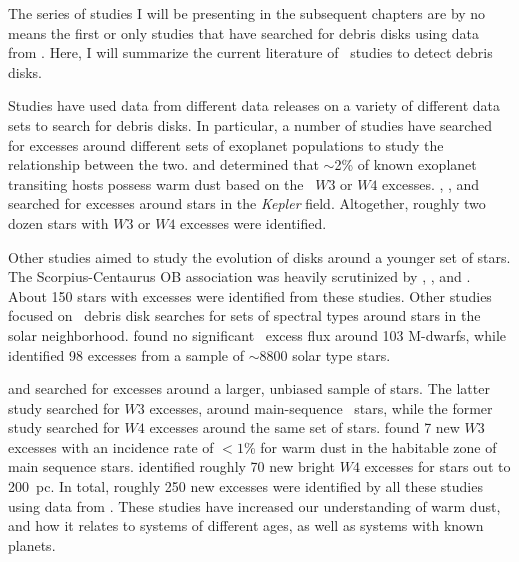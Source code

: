     The series of studies I will be presenting in the subsequent chapters are by no means the first or only studies that have searched for debris disks using data from \WS. Here, I will summarize the current literature of \WS\ studies to detect debris disks.
    
    Studies have used data from different data releases on a variety of different data sets to search for debris disks. In particular, a number of studies have searched for excesses around different sets of exoplanet populations to study the relationship between the two. \citet{Krivov2011} and \citet{Morales2012} determined that $\sim$2\% of known exoplanet transiting hosts possess warm dust based on the \WS\ $W3$ or $W4$ excesses. \citet{Kennedy2012}, \citet{Ribas2012}, and \citet{Lawler2012} searched for excesses around stars in the \textit{Kepler} field. Altogether, roughly two dozen stars with $W3$ or $W4$ excesses were identified. 
    
    Other studies aimed to study the evolution of disks around a younger set of stars. The Scorpius-Centaurus OB association was heavily scrutinized by \citet{Rizzuto2012}, \citet{Luhman2012}, and \citet{Riaz2012}. About 150 stars with excesses were identified from these studies. Other studies focused on \WS\ debris disk searches for sets of spectral types around stars in the solar neighborhood. \citet{Avenhaus2012} found no significant \WS\ excess flux around 103 M-dwarfs, while \citet{Vican2014} identified 98 excesses from a sample of $\sim$8800 solar type stars. 
    
    \citet{Wu2013} and \citet{Kennedy2013} searched for excesses around a larger, unbiased sample of stars. The latter study searched for $W3$ excesses, around main-sequence \hip\ stars, while the former study searched for $W4$ excesses around the same set of stars. \citet{Kennedy2013} found 7 new $W3$ excesses with an incidence rate of $<1$\% for warm dust in the habitable zone of main sequence stars. \citet{Wu2013} identified roughly 70 new bright $W4$ excesses for stars out to 200~pc. In total, roughly 250 new excesses were identified by all these studies using data from \WS. These studies have increased our understanding of warm dust, and how it relates to systems of different ages, as well as systems with known planets. 
    
